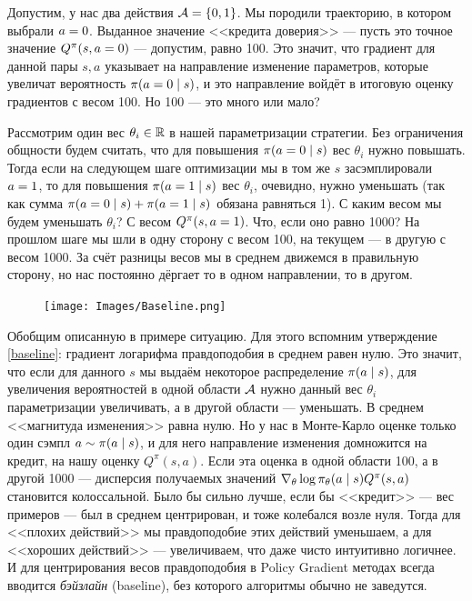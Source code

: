 \begin{example}
Допустим, у нас два действия $\mathcal{A} = \{0, 1\}$. Мы породили траекторию, в котором выбрали $a \HM= 0$. Выданное значение <<кредита доверия>> --- пусть это точное значение $Q^{\pi}(s, a \HM= 0)$ --- допустим, равно 100. Это значит, что градиент для данной пары $s, a$ указывает на направление изменение параметров, которые увеличат вероятность $\pi(a \HM= 0 \HM\mid s)$, и это направление войдёт в итоговую оценку градиентов с весом 100. Но 100 --- это много или мало?

Рассмотрим один вес $\theta_i \in \mathbb{R}$ в нашей параметризации стратегии. Без ограничения общности будем считать, что для повышения $\pi(a \HM= 0 \HM\mid s)$ вес $\theta_i$ нужно повышать. Тогда если на следующем шаге оптимизации мы в том же $s$ засэмплировали $a \HM= 1$, то для повышения $\pi(a \HM= 1 \HM\mid s)$ вес $\theta_i$, очевидно, нужно уменьшать (так как сумма $\pi(a \HM= 0 \HM\mid s) \HM+ \pi(a \HM= 1 \HM\mid s)$ обязана равняться 1). С каким весом мы будем уменьшать $\theta_i$? С весом $Q^{\pi}(s, a \HM= 1)$. Что, если оно равно 1000? На прошлом шаге мы шли в одну сторону с весом 100, на текущем --- в другую с весом 1000. За счёт разницы весов мы в среднем движемся в правильную сторону, но нас постоянно дёргает то в одном направлении, то в другом.
\end{example}

\begin{figure}
\vspace{-0.2cm}
\centering
\texttt{[image: Images/Baseline.png]}
\vspace{-1cm}
\end{figure}

Обобщим описанную в примере ситуацию. Для этого вспомним утверждение \eqref{baseline}: градиент логарифма правдоподобия в среднем равен нулю. Это значит, что если для данного $s$ мы выдаём некоторое распределение $\pi(a \HM\mid s)$, для увеличения вероятностей в одной области $\mathcal{A}$ нужно данный вес $\theta_i$ параметризации увеличивать, а в другой области --- уменьшать. В среднем <<магнитуда изменения>> равна нулю. Но у нас в Монте-Карло оценке только один сэмпл $a \sim \pi(a \HM\mid s)$, и для него направление изменения домножится на кредит, на нашу оценку $Q^{\pi}(s, a)$. Если эта оценка в одной области 100, а в другой 1000 --- дисперсия получаемых значений $\nabla_\theta \log \pi_\theta(a \HM\mid s) Q^{\pi}(s, a)$ становится колоссальной. Было бы сильно лучше, если бы <<кредит>> --- вес примеров --- был в среднем центрирован, и тоже колебался возле нуля. Тогда для <<плохих действий>> мы правдоподобие этих действий уменьшаем, а для <<хороших действий>> --- увеличиваем, что даже чисто интуитивно логичнее. И для центрирования весов правдоподобия в Policy Gradient методах всегда вводится \emph{бэйзлайн} (baseline), без которого алгоритмы обычно не заведутся.

